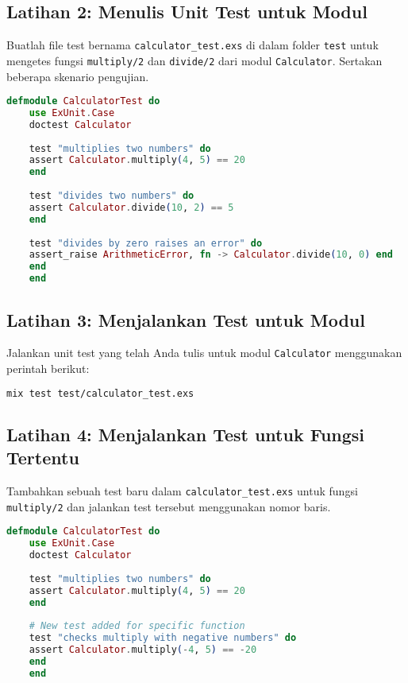 \subsection{Latihan 2: Menulis Unit Test untuk Modul}

Buatlah file test bernama \texttt{calculator\_test.exs} di dalam folder \texttt{test} untuk mengetes fungsi \texttt{multiply/2} dan \texttt{divide/2} dari modul \texttt{Calculator}. Sertakan beberapa skenario pengujian.

\begin{lstlisting}[language=Elixir]
	defmodule CalculatorTest do
	use ExUnit.Case
	doctest Calculator
	
	test "multiplies two numbers" do
	assert Calculator.multiply(4, 5) == 20
	end
	
	test "divides two numbers" do
	assert Calculator.divide(10, 2) == 5
	end
	
	test "divides by zero raises an error" do
	assert_raise ArithmeticError, fn -> Calculator.divide(10, 0) end
	end
	end
\end{lstlisting}

\subsection{Latihan 3: Menjalankan Test untuk Modul}

Jalankan unit test yang telah Anda tulis untuk modul \texttt{Calculator} menggunakan perintah berikut:

\begin{lstlisting}[language=Bash]
	mix test test/calculator_test.exs
\end{lstlisting}

\subsection{Latihan 4: Menjalankan Test untuk Fungsi Tertentu}

Tambahkan sebuah test baru dalam \texttt{calculator\_test.exs} untuk fungsi \texttt{multiply/2} dan jalankan test tersebut menggunakan nomor baris.

\begin{lstlisting}[language=Elixir]
	defmodule CalculatorTest do
	use ExUnit.Case
	doctest Calculator
	
	test "multiplies two numbers" do
	assert Calculator.multiply(4, 5) == 20
	end
	
	# New test added for specific function
	test "checks multiply with negative numbers" do
	assert Calculator.multiply(-4, 5) == -20
	end
	end
\end{lstlisting}

